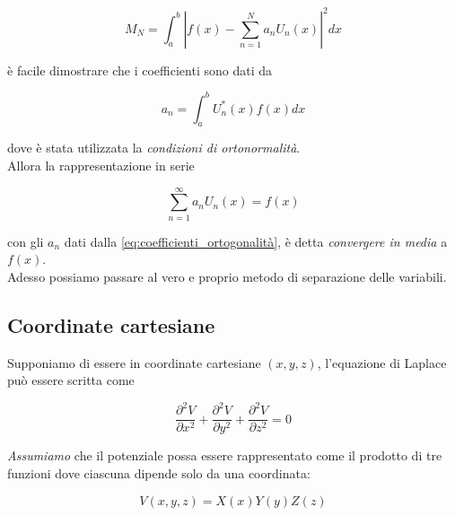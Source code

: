\begin{equation*}
    M_N = \int_a ^b \left | f(x) - \sum_{n = 1}^N a_n U_n(x) \right |^2 dx
\end{equation*}

è facile dimostrare che i coefficienti sono dati da 

\begin{tcolorbox}[colback=yellow!10!white, colframe=orange!70!black, boxrule=0.8pt]
\begin{equation}
    a_n = \int_a ^b U_n^* (x) f(x) dx
    \label{eq:coefficienti_ortogonalità}
\end{equation}
\end{tcolorbox}

dove è stata utilizzata la \emph{condizioni di ortonormalità}. \\

Allora la rappresentazione in serie

\begin{equation*}
    \sum_{n=1} ^ \infty a_n U_n (x) = f(x)
\end{equation*}

con gli $a_n$ dati dalla \ref{eq:coefficienti_ortogonalità}, è detta \emph{convergere in media} a $f(x)$.\\

Adesso possiamo passare al vero e proprio metodo di separazione delle variabili.

\newpage

\subsection{Coordinate cartesiane}

Supponiamo di essere in coordinate cartesiane $(x,y,z)$, l'equazione di Laplace può essere scritta come

\begin{equation}
    \frac{\partial^2 V}{\partial x^2} + \frac{\partial^2 V}{\partial y^2} + \frac{\partial^2 V}{\partial z^2} = 0
    \label{eq:laplaciano_coordinate_polari}
\end{equation}

\emph{Assumiamo} che il potenziale possa essere rappresentato come il prodotto di tre funzioni dove ciascuna dipende solo da una coordinata:

\begin{equation}
    V(x,y,z) = X(x)Y(y)Z(z) 
    \label{eq:potenziale_prodotto}
\end{equation}

